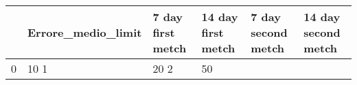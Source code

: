 \begin{tabular}{llllll}
\toprule
 & Errore_medio_limit & 7 day first metch & 14 day first metch & 7 day second metch & 14 day second metch \\
\midrule
0 & 10%
1 & 20%
2 & 50%
\bottomrule
\end{tabular}
